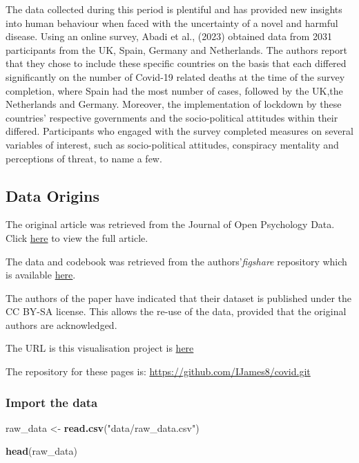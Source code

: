 \documentclass[
]{article}
\newenvironment{Shaded}{\begin{snugshade}}{\end{snugshade}}
\newcommand{\FunctionTok}[1]{\textcolor[rgb]{0.13,0.29,0.53}{\textbf{#1}}}
\newcommand{\NormalTok}[1]{#1}
\newcommand{\OtherTok}[1]{\textcolor[rgb]{0.56,0.35,0.01}{#1}}
\newcommand{\StringTok}[1]{\textcolor[rgb]{0.31,0.60,0.02}{#1}}
\begin{document}
The data collected during this period is plentiful and has provided new
insights into human behaviour when faced with the uncertainty of a novel
and harmful disease. Using an online survey, Abadi et al., (2023)
obtained data from 2031 participants from the UK, Spain, Germany and
Netherlands. The authors report that they chose to include these
specific countries on the basis that each differed significantly on the
number of Covid-19 related deaths at the time of the survey completion,
where Spain had the most number of cases, followed by the UK,the
Netherlands and Germany. Moreover, the implementation of lockdown by
these countries' respective governments and the socio-political
attitudes within their differed. Participants who engaged with the
survey completed measures on several variables of interest, such as
socio-political attitudes, conspiracy mentality and perceptions of
threat, to name a few.

\subsection{Data Origins}\label{data-origins}

The original article was retrieved from the Journal of Open Psychology
Data. Click
\href{https://openpsychologydata.metajnl.com/articles/10.5334/jopd.86\#4}{here}
to view the full article.

The data and codebook was retrieved from the authors'\emph{figshare}
repository which is available
\href{https://uvaauas.figshare.com/articles/dataset/A_Dataset_of_Social-Psychological_and_Emotional_Reactions_during_the_COVID-19_Pandemic_across_Four_European_Countries/17085719?file=41458140}{here}.

The authors of the paper have indicated that their dataset is published
under the CC BY-SA license. This allows the re-use of the data, provided
that the original authors are acknowledged.

The URL is this visualisation project is
\href{https://ijames8.github.io/covid/}{here}

The repository for these pages is:
\url{https://github.com/IJames8/covid.git}

\subsubsection{Import the data}\label{import-the-data}

\begin{Shaded}
\begin{Highlighting}[]
\NormalTok{raw\_data }\OtherTok{\textless{}{-}} \FunctionTok{read.csv}\NormalTok{(}\StringTok{"data/raw\_data.csv"}\NormalTok{)}

\FunctionTok{head}\NormalTok{(raw\_data)}
\end{Highlighting}
\end{Shaded}
\end{document}
